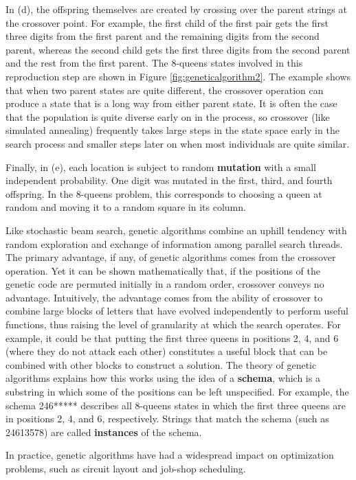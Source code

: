 In (d), the offspring themselves are created by crossing over the parent strings at the crossover point. For example, the first child of the first pair gets the first three digits from the first parent and the remaining digits from the second parent, whereas the second child gets the first three digits from the second parent and the rest from the first parent. The 8-queens states involved in this reproduction step are shown in Figure \ref{fig:geneticalgorithm2}. The example shows that when two parent states are quite different, the crossover operation can produce a state that is a long way from either parent state. It is often the case that the population is quite diverse early on in the process, so crossover (like simulated annealing) frequently takes large steps in the state space early in the search process and smaller steps later on when most individuals are quite similar.

Finally, in (e), each location is subject to random \textbf{mutation} with a small independent probability. One digit was mutated in the first, third, and fourth offspring. In the 8-queens problem, this corresponds to choosing a queen at random and moving it to a random square in its column.

Like stochastic beam search, genetic algorithms combine an uphill tendency with random exploration and exchange of information among parallel search threads.
The primary advantage, if any, of genetic algorithms comes from the crossover operation. Yet it can be shown mathematically that, if the positions of the genetic code are permuted initially in a random order, crossover conveys no advantage. Intuitively, the advantage comes from the ability of crossover to combine large blocks of letters that have evolved independently to perform useful functions, thus raising the level of granularity at which the search operates. For example, it could be that putting the first three queens in positions 2, 4, and 6 (where they do not attack each other) constitutes a useful block that can be combined with other blocks to construct a solution. 
The theory of genetic algorithms explains how this works using the idea of a \textbf{schema}, which is a substring in which some of the positions can be left unspecified. For example, the schema 246***** describes all 8-queens states in which the first three queens are in positions 2, 4, and 6, respectively. Strings that match the schema (such as 24613578) are called \textbf{instances} of the schema.

In practice, genetic algorithms have had a widespread impact on optimization problems, such as circuit layout and job-shop scheduling.
